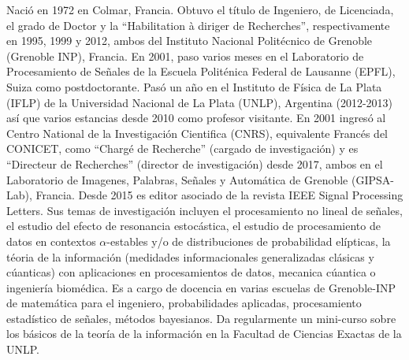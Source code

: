 Naci\'o  en  1972 en  Colmar,  Francia.  Obtuvo  el  t\'itulo  de Ingeniero,  de
Licenciada, el grado de Doctor  y la ``Habilitation \`a diriger de Recherches'',
respectivamente en 1995, 1999 y 2012, ambos del Instituto Nacional Polit\'ecnico
de  Grenoble  (Grenoble  INP),  Francia.   En  2001, paso  varios  meses  en  el
Laboratorio de Procesamiento de Se\~nales  de la Escuela Polit\'enica Federal de
Lausanne (EPFL), Suiza como postdoctorante.   Pas\'o un a\~no en el Instituto de
F\'isica  de La  Plata (IFLP)  de la  Universidad Nacional  de La  Plata (UNLP),
Argentina  (2012-2013)  as\'i que  varios  estancias  desde  2010 como  profesor
visitante.   En  2001  ingres\'o   al  Centro  National  de  la  Investigaci\'on
Cientifica  (CNRS),  equivalente  Franc\'es  del  CONICET,  como  ``Charg\'e  de
Recherche''  (cargado  de  investigaci\'on)  y es  ``Directeur  de  Recherches''
(director de investigaci\'on)  desde 2017, ambos en el  Laboratorio de Imagenes,
Palabras, Se\~nales y Autom\'atica de Grenoble (GIPSA-Lab), Francia.  Desde 2015
es editor asociado  de la revista IEEE Signal Processing  Letters.  Sus temas de
investigaci\'on incluyen el procesamiento no lineal de se\~nales, el estudio del
efecto  de resonancia  estoc\'astica, el  estudio de  procesamiento de  datos en
contextos $\alpha$-estables  y/o de distribuciones  de probabilidad el\'ipticas,
la  t\'eoria  de   la  informaci\'on  (medidades  informacionales  generalizadas
cl\'asicas y c\'uanticas) con  aplicaciones en procesamientos de datos, mecanica
c\'uantica  o  ingenier\'ia biom\'edica.   Es  a  cargo  de docencia  en  varias
escuelas  de  Grenoble-INP de  matem\'atica  para  el ingeniero,  probabilidades
aplicadas, procesamiento  estad\'istico de se\~nales,  m\'etodos bayesianos.  Da
regularmente  un   mini-curso  sobre  los   b\'asicos  de  la  teor\'ia   de  la
informaci\'on en la Facultad de Ciencias Exactas de la UNLP.